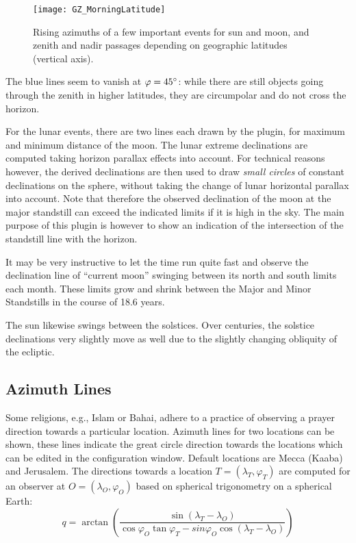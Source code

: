 \begin{figure}[t]
\texttt{[image: GZ\_MorningLatitude]}
\caption{Rising azimuths of a few important events for sun and moon,
  and zenith and nadir passages depending on geographic latitudes
  (vertical axis).}
\label{fig:plugin:ArchaeoLines:MorningLatitudes}
\end{figure}

The blue lines seem to vanish at $\varphi=45\degree$: while there are
still objects going through the zenith in higher latitudes, they are
circumpolar and do not cross the horizon.

For the lunar events, there are two lines each drawn by the plugin,
for maximum and minimum distance of the moon.  The lunar extreme
declinations are computed taking horizon parallax effects into
account. For technical reasons however, the derived declinations are
then used to draw \emph{small circles} of constant declinations on the
sphere, without taking the change of lunar horizontal parallax into
account.  Note that therefore the observed declination of the moon at
the major standstill can exceed the indicated limits if it is high in
the sky. The main purpose of this plugin is however to show an
indication of the intersection of the standstill line with the
horizon.

It may be very instructive to let the time run quite fast and observe
the declination line of ``current moon'' swinging between its north
and south limits each month.  These limits grow and shrink between the
Major and Minor Standstills in the course of 18.6 years.

The sun likewise swings between the solstices. Over centuries, the
solstice declinations very slightly move as well due to the slightly
changing obliquity of the ecliptic.

\subsection{Azimuth Lines}
\label{sec:plugin:ArchaeoLines:Azimuths}

Some religions, e.g., Islam or Bahai, adhere to a practice of
observing a prayer direction towards a particular location.  Azimuth
lines for two locations can be shown, these lines indicate the great
circle direction towards the locations which can be edited in the
configuration window. Default locations are Mecca (Kaaba) and
Jerusalem.  The directions towards a location $T=(\lambda_T,
\varphi_T)$ are computed for an observer at $O=(\lambda_O, \varphi_O)$
based on spherical trigonometry on a spherical
Earth\cite{Abdali:1997}:
\begin{equation}
  \label{eq:qibla}
  q=\arctan\left(\frac{\sin (\lambda_{T} - \lambda_O) } { \cos\varphi_O \tan\varphi_T - sin \varphi_O \cos(\lambda_{T} - \lambda_O) }\right)
\end{equation}

